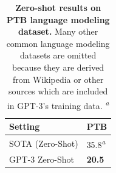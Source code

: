 \documentclass{article}
\begin{document}
\begin{table}
    
    \centering
        \begin{tabular}{ll}
        \toprule
        Setting & PTB  \\ 
        \midrule
        SOTA (Zero-Shot) & 35.8\textsuperscript{\textit{a}} \\
        GPT-3 Zero-Shot & \textbf{20.5}\\
        \bottomrule
        \end{tabular}
        
    \caption{\textbf{Zero-shot results on PTB language modeling dataset.} Many other common language modeling datasets are omitted because they are derived from Wikipedia or other sources which are included in GPT-3's training data. \textsuperscript{\textit{a}}\cite{radford2019language}}
    \label{table:language}
\end{table}
        
\end{document}
